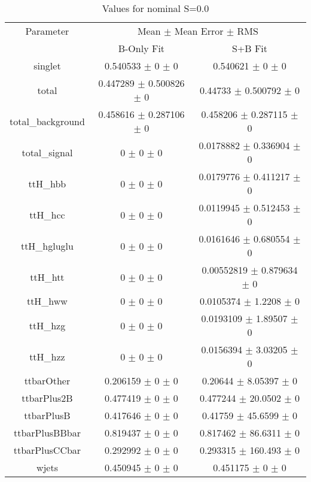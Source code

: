 \begin{table}
\centering
\caption{Values for nominal S=0.0}
\begin{tabular}{ccc}
\toprule
Parameter & \multicolumn{2}{c}{Mean $\pm$ Mean Error $\pm$ RMS}\\
 & B-Only Fit & S+B Fit\\
\midrule
singlet & \num{0.540533} $\pm$ \num{0} $\pm$ \num{0} & \num{0.540621} $\pm$ \num{0} $\pm$ \num{0}\\
total & \num{0.447289} $\pm$ \num{0.500826} $\pm$ \num{0} & \num{0.44733} $\pm$ \num{0.500792} $\pm$ \num{0}\\
total\_background & \num{0.458616} $\pm$ \num{0.287106} $\pm$ \num{0} & \num{0.458206} $\pm$ \num{0.287115} $\pm$ \num{0}\\
total\_signal & \num{0} $\pm$ \num{0} $\pm$ \num{0} & \num{0.0178882} $\pm$ \num{0.336904} $\pm$ \num{0}\\
ttH\_hbb & \num{0} $\pm$ \num{0} $\pm$ \num{0} & \num{0.0179776} $\pm$ \num{0.411217} $\pm$ \num{0}\\
ttH\_hcc & \num{0} $\pm$ \num{0} $\pm$ \num{0} & \num{0.0119945} $\pm$ \num{0.512453} $\pm$ \num{0}\\
ttH\_hgluglu & \num{0} $\pm$ \num{0} $\pm$ \num{0} & \num{0.0161646} $\pm$ \num{0.680554} $\pm$ \num{0}\\
ttH\_htt & \num{0} $\pm$ \num{0} $\pm$ \num{0} & \num{0.00552819} $\pm$ \num{0.879634} $\pm$ \num{0}\\
ttH\_hww & \num{0} $\pm$ \num{0} $\pm$ \num{0} & \num{0.0105374} $\pm$ \num{1.2208} $\pm$ \num{0}\\
ttH\_hzg & \num{0} $\pm$ \num{0} $\pm$ \num{0} & \num{0.0193109} $\pm$ \num{1.89507} $\pm$ \num{0}\\
ttH\_hzz & \num{0} $\pm$ \num{0} $\pm$ \num{0} & \num{0.0156394} $\pm$ \num{3.03205} $\pm$ \num{0}\\
ttbarOther & \num{0.206159} $\pm$ \num{0} $\pm$ \num{0} & \num{0.20644} $\pm$ \num{8.05397} $\pm$ \num{0}\\
ttbarPlus2B & \num{0.477419} $\pm$ \num{0} $\pm$ \num{0} & \num{0.477244} $\pm$ \num{20.0502} $\pm$ \num{0}\\
ttbarPlusB & \num{0.417646} $\pm$ \num{0} $\pm$ \num{0} & \num{0.41759} $\pm$ \num{45.6599} $\pm$ \num{0}\\
ttbarPlusBBbar & \num{0.819437} $\pm$ \num{0} $\pm$ \num{0} & \num{0.817462} $\pm$ \num{86.6311} $\pm$ \num{0}\\
ttbarPlusCCbar & \num{0.292992} $\pm$ \num{0} $\pm$ \num{0} & \num{0.293315} $\pm$ \num{160.493} $\pm$ \num{0}\\
wjets & \num{0.450945} $\pm$ \num{0} $\pm$ \num{0} & \num{0.451175} $\pm$ \num{0} $\pm$ \num{0}\\
\bottomrule
\end{tabular}
\end{table}